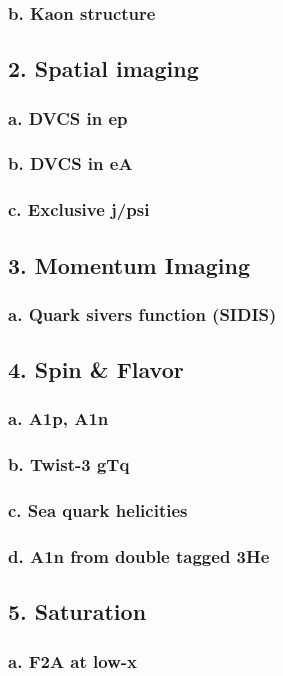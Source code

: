 \documentclass{report}
\begin{document}
\subsubsection{b. Kaon structure}
\subsection{2. Spatial imaging}
\subsubsection{a. DVCS in ep}
\subsubsection{b. DVCS in eA}
\subsubsection{c. Exclusive j/psi}
\subsection{3. Momentum Imaging}
\subsubsection{a. Quark sivers function (SIDIS)}
\subsection{4. Spin \& Flavor}
\subsubsection{a. A1p, A1n}
\subsubsection{b. Twist-3 gTq}
\subsubsection{c. Sea quark helicities}
\subsubsection{d. A1n from double tagged 3He}
\subsection{5. Saturation}
\subsubsection{a. F2A at low-x}
\end{document}

